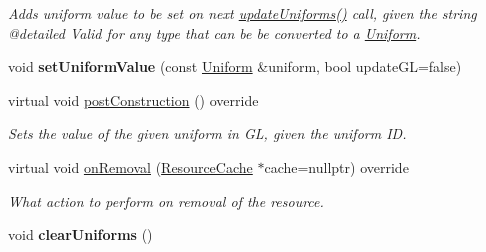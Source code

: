 \begin{Indent}
\begin{DoxyCompactItemize}
\begin{DoxyCompactList}\small\item\em Adds uniform value to be set on next \mbox{\hyperlink{classrev_1_1_shader_program_ad48c1c3ccf8fe60f7dd36abde11ee793}{update\+Uniforms()}} call, given the string @detailed Valid for any type that can be be converted to a \mbox{\hyperlink{structrev_1_1_uniform}{Uniform}}. \end{DoxyCompactList}\item 
\mbox{\label{classrev_1_1_shader_program_ad8ed946cde7fbae434bf678bd4454d77}} 
void {\bfseries set\+Uniform\+Value} (const \mbox{\hyperlink{structrev_1_1_uniform}{Uniform}} \&uniform, bool update\+GL=false)
\item 
virtual void \mbox{\hyperlink{classrev_1_1_shader_program_a1b08ee659241ede0227457821a4971a2}{post\+Construction}} () override
\begin{DoxyCompactList}\small\item\em Sets the value of the given uniform in GL, given the uniform ID. \end{DoxyCompactList}\item 
\mbox{\label{classrev_1_1_shader_program_a59637a18de57dd5eb81854ac535220eb}} 
virtual void \mbox{\hyperlink{classrev_1_1_shader_program_a59637a18de57dd5eb81854ac535220eb}{on\+Removal}} (\mbox{\hyperlink{classrev_1_1_resource_cache}{Resource\+Cache}} $\ast$cache=nullptr) override
\begin{DoxyCompactList}\small\item\em What action to perform on removal of the resource. \end{DoxyCompactList}\item 
\mbox{\label{classrev_1_1_shader_program_addf0a00bf95f047f3714ac711a10e57e}} 
void {\bfseries clear\+Uniforms} ()
\end{DoxyCompactItemize}
\end{Indent}
